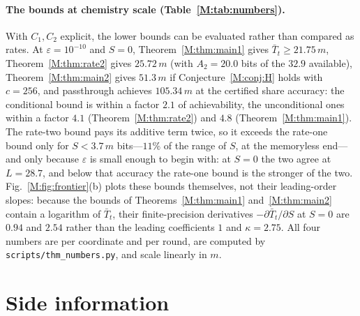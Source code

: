 \documentclass[aps,prx,twocolumn,superscriptaddress,nofootinbib,longbibliography]{revtex4-2}
\theoremstyle{plain}
\theoremstyle{definition}
\theoremstyle{remark}
\begin{document}
\paragraph{The bounds at chemistry scale (Table~\ref{M:tab:numbers}).} With $C_1,C_2$ explicit, the lower bounds can be evaluated rather than compared as rates. At $\varepsilon=10^{-10}$ and $S=0$, Theorem~\ref{M:thm:main1} gives $\bar T_t\ge21.75\,m$, Theorem~\ref{M:thm:rate2} gives $25.72\,m$ (with $A_2=20.0$ bits of the $32.9$ available), Theorem~\ref{M:thm:main2} gives $51.3\,m$ if Conjecture~\ref{M:conj:H} holds with $c=256$, and passthrough achieves $105.34\,m$ at the certified share accuracy: the conditional bound is within a factor $2.1$ of achievability, the unconditional ones within a factor $4.1$ (Theorem~\ref{M:thm:rate2}) and $4.8$ (Theorem~\ref{M:thm:main1}). The rate-two bound pays its additive term twice, so it exceeds the rate-one bound only for $S<3.7\,m$ bits---$11\%$ of the range of $S$, at the memoryless end---and only because $\varepsilon$ is small enough to begin with: at $S=0$ the two agree at $L=28.7$, and below that accuracy the rate-one bound is the stronger of the two. Fig.~\ref{M:fig:frontier}(b) plots these bounds themselves, not their leading-order slopes: because the bounds of Theorems~\ref{M:thm:main1} and~\ref{M:thm:main2} contain a logarithm of $\bar T_t$, their finite-precision derivatives $-\partial\bar T_t/\partial S$ at $S=0$ are $0.94$ and $2.54$ rather than the leading coefficients $1$ and $\kappa=2.75$. All four numbers are per coordinate and per round, are computed by \texttt{scripts/thm\_numbers.py}, and scale linearly in $m$.

\section{Side information}\label{sec:side}
\end{document}
